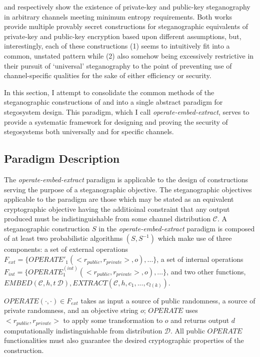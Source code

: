 \documentclass{article}
\begin{document}
\cite{BiglouPubKey} and \cite{BiglouPSS} respectively show the existence of private-key and public-key steganography in arbitrary channels 
meeting minimum entropy requirements.  Both works provide multiple provably secret constructions for steganographic equivalents of 
private-key and public-key encryption based upon different assumptions, but, interestingly, each of these constructions (1) seems to 
intuitively fit into a common, unstated pattern while (2) also somehow being excessively restrictive in their pursuit of `universal' steganography 
to the point of preventing use of channel-specific qualities for the sake of either efficiency or security.

In this section, I attempt to consolidate the common methods of the steganographic constructions of \cite{BiglouPubKey} and \cite{BiglouPSS} 
into a single abstract paradigm for stegosystem design.  This paradigm, which I call \textit{operate-embed-extract}, serves to provide 
a systematic framework for designing and proving the security of stegosystems both universally and for specific channels.

\subsection{Paradigm Description}

The \textit{operate-embed-extract} paradigm is applicable to the design of constructions serving the purpose of a steganographic objective.  
The steganographic objectives applicable to the paradigm are those which may be stated as an equivalent cryptographic objective having 
the additioinal constraint that any output produced must be indistinguishable from some channel distribution $\mathcal{C}$.
\newline\newline
A steganographic construction $S$ in the \textit{operate-embed-extract} paradigm is composed of at least two probabilistic algorithms
$(S, S^{-1})$ which make use of three components: a set of external operations $F_{ext} = \{ OPERATE'_1(<r_{public}, r_{private}>,o),...\}$, a 
set of internal operations $F_{int} = \{ OPERATE_1^{(int)}(<r_{public}, r_{private}>,o),...\}$, and two other functions, 
$EMBED(\mathcal{C},h,t~\mathcal{D}), EXTRACT(\mathcal{C},h,c_1,...,c_{l(k)})$.

$OPERATE(\cdot,\cdot) \in F_{ext}$ takes as input a source of public randomness, a source of private randomness, and an objective string $o$; 
$OPERATE$ uses $<r_{public}, r_{private}>$ to apply some transformation to $o$ and returns output 
$d$ computationally indistinguishable from distribution $\mathcal{D}$.  All public $OPERATE$ functionalities must also guarantee 
the desired cryptographic properties of the construction.
\end{document}
